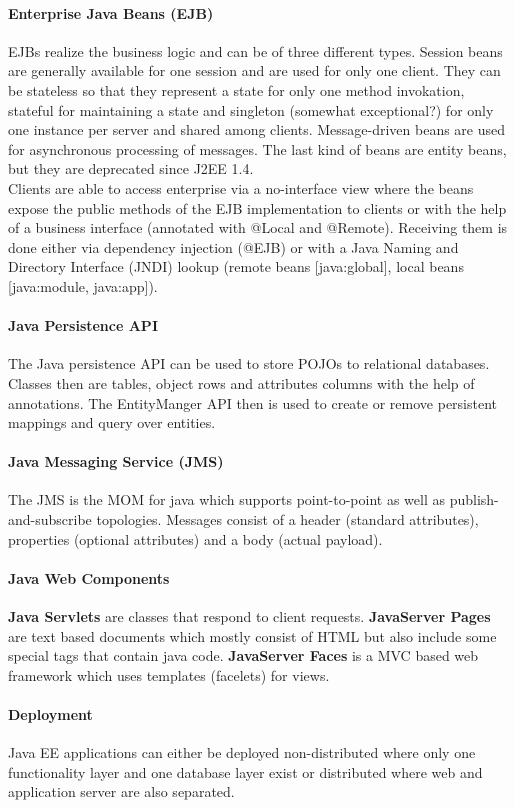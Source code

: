 \paragraph{Enterprise Java Beans (EJB)}
EJBs realize the business logic and can be of three different types.
Session beans are generally available for one session and are used for only one client.
They can be stateless so that they represent a state for only one method invokation, stateful for maintaining a state and singleton (somewhat exceptional?) for only one instance per server and shared among clients.
Message-driven beans are used for asynchronous processing of messages.
The last kind of beans are entity beans, but they are deprecated since J2EE 1.4.\\
Clients are able to access enterprise via a no-interface view where the beans expose the public methods of the EJB implementation to clients or with the help of a business interface (annotated with @Local and @Remote).
Receiving them is done either via dependency injection (@EJB) or with a Java Naming and Directory Interface (JNDI) lookup (remote beans [java:global], local beans [java:module, java:app]).

\paragraph{Java Persistence API}
The Java persistence API can be used to store POJOs to relational databases.
Classes then are tables, object rows and attributes columns with the help of annotations.
The EntityManger API then is used to create or remove persistent mappings and query over entities.

\paragraph{Java Messaging Service (JMS)}
The JMS is the MOM for java which supports point-to-point as well as publish-and-subscribe topologies.
Messages consist of a header (standard attributes), properties (optional attributes) and a body (actual payload).

\paragraph{Java Web Components}
\textbf{Java Servlets} are classes that respond to client requests.
\textbf{JavaServer Pages} are text based documents which mostly consist of HTML but also include some special tags that contain java code.
\textbf{JavaServer Faces} is a MVC based web framework which uses templates (facelets) for views.

\paragraph{Deployment}
Java EE applications can either be deployed non-distributed where only one functionality layer and one database layer exist or distributed where web and application server are also separated.

